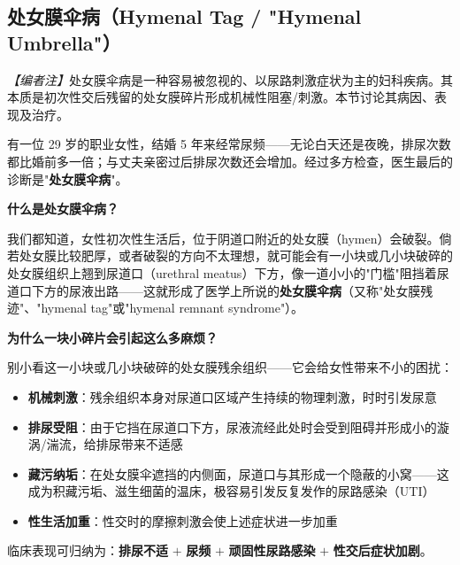 \begin{enumerate}
\subsection{处女膜伞病（Hymenal Tag / "Hymenal Umbrella"）}

\noindent\textit{【编者注】}处女膜伞病是一种容易被忽视的、以尿路刺激症状为主的妇科疾病。其本质是初次性交后残留的处女膜碎片形成机械性阻塞/刺激。本节讨论其病因、表现及治疗。

\vspace{0.5em}
有一位 29 岁的职业女性，结婚 5 年来经常尿频——无论白天还是夜晚，排尿次数都比婚前多一倍；与丈夫亲密过后排尿次数还会增加。经过多方检查，医生最后的诊断是"\textbf{处女膜伞病}"。

\vspace{0.5em}
\noindent\textbf{什么是处女膜伞病？}

我们都知道，女性初次性生活后，位于阴道口附近的处女膜（hymen）会破裂。倘若处女膜比较肥厚，或者破裂的方向不太理想，就可能会有一小块或几小块破碎的处女膜组织上翘到尿道口（urethral meatus）下方，像一道小小的"门槛"阻挡着尿道口下方的尿液出路——这就形成了医学上所说的\textbf{处女膜伞病}（又称"处女膜残迹"、"hymenal tag"或"hymenal remnant syndrome"）。

\vspace{0.5em}
\noindent\textbf{为什么一块小碎片会引起这么多麻烦？}

别小看这一小块或几小块破碎的处女膜残余组织——它会给女性带来不小的困扰：

\begin{itemize}
	\item \textbf{机械刺激}：残余组织本身对尿道口区域产生持续的物理刺激，时时引发尿意
	\item \textbf{排尿受阻}：由于它挡在尿道口下方，尿液流经此处时会受到阻碍并形成小的漩涡/湍流，给排尿带来不适感
	\item \textbf{藏污纳垢}：在处女膜伞遮挡的内侧面，尿道口与其形成一个隐蔽的小窝——这成为积藏污垢、滋生细菌的温床，极容易引发反复发作的尿路感染（UTI）
	\item \textbf{性生活加重}：性交时的摩擦刺激会使上述症状进一步加重
\end{itemize}

临床表现可归纳为：\textbf{排尿不适} $+$ \textbf{尿频} $+$ \textbf{顽固性尿路感染} $+$ \textbf{性交后症状加剧}。


\end{enumerate}
